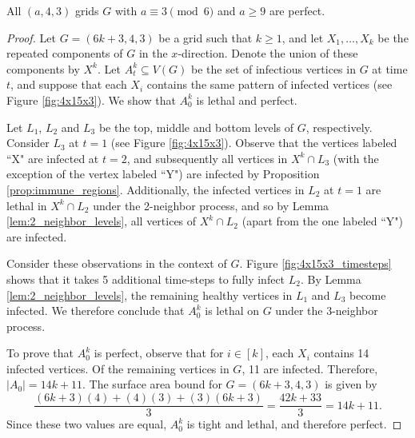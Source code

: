 \begin{con}
\label{con:3x4xa}
All $(a,4,3)$ grids $G$ with $a \equiv 3 \pmod 6$ and $a \geq 9$ are perfect. 
\end{con}

\begin{proof}
Let $G=(6k+3,4,3)$ be a grid such that $k \geq 1$, and let $X_1, \dots, X_{k}$ be the repeated components of $G$ in the $x$-direction. Denote the union of these components by $X^k$. Let $A_t^k \subseteq V(G)$ be the set of infectious vertices in $G$ at time $t$, and suppose that each $X_i$ contains the same pattern of infected vertices (see Figure \ref{fig:4x15x3}). We show that $A_0^k$ is lethal and perfect. 

Let $L_1$, $L_2$ and $L_3$ be the top, middle and bottom levels of $G$, respectively. Consider $L_3$ at $t=1$ (see Figure \ref{fig:4x15x3}). Observe that the vertices labeled ``X" are infected at $t=2$, and subsequently all vertices in $X^k \cap L_3$ (with the exception of the vertex labeled ``Y") are infected by Proposition \ref{prop:immune_regions}. Additionally, the infected vertices in $L_2$ at $t=1$ are lethal in $X^k \cap L_2$ under the 2-neighbor process, and so by Lemma \ref{lem:2_neighbor_levels}, all vertices of $X^k \cap L_2$ (apart from the one labeled ``Y") are infected.

Consider these observations in the context of $G$. Figure \ref{fig:4x15x3_timesteps} shows that it takes 5 additional time-steps to fully infect $L_2$. By Lemma \ref{lem:2_neighbor_levels}, the remaining healthy vertices in $L_1$ and $L_3$ become infected. We therefore conclude that $A_0^k$ is lethal on $G$ under the 3-neighbor process.

To prove that $A_0^k$ is perfect, observe that for $i \in [k]$, each $X_i$ contains 14 infected vertices. Of the remaining vertices in $G$, 11 are infected. Therefore, $|A_0| = 14k+11$. The surface area bound for $G=(6k+3,4,3)$ is given by
$$\frac{(6k+3)(4) + (4)(3) + (3)(6k+3)}{3} = \frac{42k + 33}{3} = 14k+11.$$
Since these two values are equal, $A_0^k$ is tight and lethal, and therefore perfect.
\end{proof}

